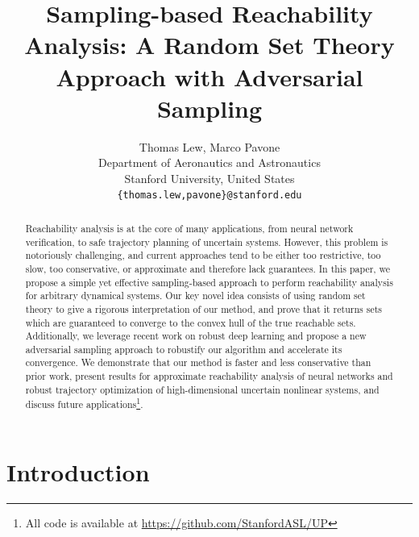 \documentclass{article}
\title{Sampling-based Reachability Analysis: A Random Set Theory Approach with Adversarial Sampling}
\author{%
    Thomas Lew, Marco Pavone\\
    Department of Aeronautics and Astronautics\\
    Stanford University,  
    United States\\
    \texttt{\{thomas.lew,pavone\}@stanford.edu}
}
\begin{document}
\maketitle

\begin{abstract}    
Reachability analysis is at the core of many applications, from neural network verification, to safe trajectory planning of uncertain systems. However, this problem is notoriously challenging, and current approaches tend to be either too restrictive, too slow, too conservative, or approximate and therefore lack guarantees. In this paper, we propose a simple yet effective sampling-based approach to perform reachability analysis for arbitrary dynamical systems. Our key novel idea consists of using random set theory to give a rigorous interpretation of our method, and prove that it returns sets which are guaranteed to converge to the convex hull of the true reachable sets. Additionally, we leverage recent work on robust deep learning and propose a new adversarial sampling approach to robustify our algorithm and accelerate its convergence. We demonstrate that our method is faster and less conservative than prior work, present results for approximate reachability analysis of neural networks and robust trajectory optimization of high-dimensional uncertain nonlinear systems, and discuss future applications\footnote{All code is available at \href{https://github.com/StanfordASL/UP}{https://github.com/StanfordASL/UP}}.

\end{abstract}



\section{Introduction}\label{sec:intro}
\end{document}
